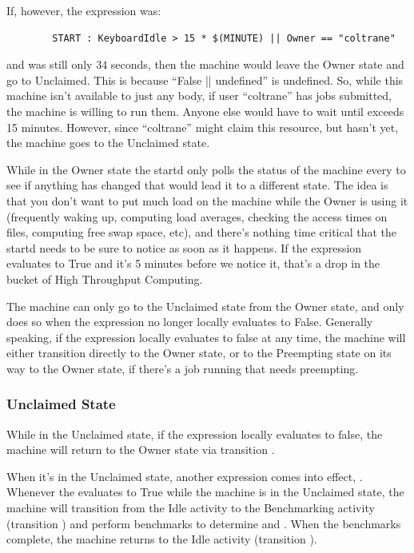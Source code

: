 If, however, the  expression was:
\begin{verbatim}
        START : KeyboardIdle > 15 * $(MINUTE) || Owner == "coltrane"
\end{verbatim}
and  was still only 34 seconds, then the machine
would leave the Owner state and go to Unclaimed.  This is because
``False || undefined'' is undefined.  So, while this machine isn't
available to just any body, if user ``coltrane'' has jobs submitted,
the machine is willing to run them.  Anyone else would have to wait
until  exceeds 15 minutes.  However, since
``coltrane'' might claim this resource, but hasn't yet, the machine
goes to the Unclaimed state.

While in the Owner state the startd only polls the status of the
machine every  to see if anything has changed
that would lead it to a different state.  The idea is that you don't
want to put much load on the machine while the Owner is using it
(frequently waking up, computing load averages, checking the access
times on files, computing free swap space, etc), and there's nothing
time critical that the startd needs to be sure to notice as soon as it
happens.  If the  expression evaluates to True and it's 5
minutes before we notice it, that's a drop in the bucket of High
Throughput Computing.

The machine can only go to the Unclaimed state from the Owner state,
and only does so when the  expression no longer locally
evaluates to False.  Generally speaking, if the 
expression locally evaluates to false at any time, the machine will
either transition directly to the Owner state, or to the Preempting
state on its way to the Owner state, if there's a job running that
needs preempting.

\subsubsection{\label{sec:Unclaimed-State}Unclaimed State}

While in the Unclaimed state, if the  expression locally
evaluates to false, the machine will return to the Owner state via
transition .

When it's in the Unclaimed state, another expression comes into
effect,  \label{param:RunBenchmarks}.  
Whenever the  evaluates to True while the machine
is in the Unclaimed state, the machine will transition from the Idle
activity to the Benchmarking activity (transition ) and
perform benchmarks to determine  and .  
When the benchmarks complete, the machine returns to the Idle activity
(transition ).

